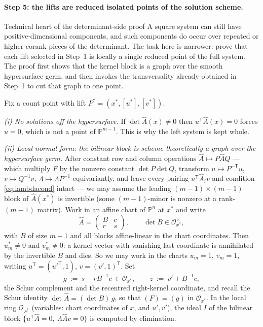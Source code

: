 \documentclass[acmsmall,screen,nonacm]{acmart}
\theoremstyle{definition}
\theoremstyle{remark}
\newcommand{\PP}{\mathbb{P}}
\newcommand{\OO}{\mathcal{O}}
\begin{document}
\paragraph{Step 5: the lifts are reduced isolated points of the
solution scheme.}
\begin{warningbox}{Technical heart of the determinant-side proof}
A square system can still have positive-dimensional components, and such
components do occur over repeated or higher-corank pieces of the determinant.
The task here is narrower: prove that each lift selected in Step~1 is locally
a single reduced point of the full system.  The proof first shows that the
kernel block is a graph over the smooth hypersurface germ, and then invokes
the transversality already obtained in Step~1 to cut that graph to one point.
\end{warningbox}
Fix a count point with lift $P^*=(x^*,[u^*],[v^*])$.

\emph{(i) No solutions off the hypersurface.}  If
$\det\widehat A(x)\ne0$ then $u^{\mathsf T}\widehat A(x)=0$ forces
$u=0$, which is not a point of $\PP^{m-1}$.  This is why the left
system is kept whole.

\emph{(ii) Local normal form: the bilinear block is
scheme-theoretically a graph over the hypersurface germ.}
After constant row and column operations
$\widehat A\mapsto P\widehat AQ$ --- which multiply $F$ by the nonzero
constant $\det P\det Q$, transform
$u\mapsto P^{-\mathsf T}u$, $v\mapsto Q^{-1}v$,
$\Lambda\mapsto\Lambda P^{-1}$ equivariantly, and leave every pairing
$u^{\mathsf T}\widehat A_iv$ and condition \eqref{eq:lambdacond}
intact --- we may assume the leading $(m-1)\times(m-1)$ block of
$\widehat A(x^*)$ is invertible (some $(m-1)$-minor is nonzero at a
rank-$(m-1)$ matrix).  Work in an affine chart of $\PP^n$ at $x^*$ and
write
\[
  \widehat A=\begin{pmatrix}B&c\\ r&s\end{pmatrix},
  \qquad \det B\in\OO_{x^*}^{\times},
\]
with $B$ of size $m-1$ and all blocks affine-linear in the chart
coordinates.  Then $u^*_m\ne0$ and $v^*_m\ne0$: a kernel vector with
vanishing last coordinate is annihilated by the invertible $B$ and
dies.  So we may work in the charts $u_m=1$, $v_m=1$, writing
$u^{\mathsf T}=(u'^{\mathsf T},1)$, $v=(v',1)^{\mathsf T}$.  Set
\[
  g\ :=\ s-rB^{-1}c\ \in\OO_{x^*},
  \qquad
  z\ :=\ v'+B^{-1}c ,
\]
the Schur complement and the recentred right-kernel coordinate, and
recall the Schur identity
$\det\widehat A=(\det B)\,g$, so that $(F)=(g)$ in $\OO_{x^*}$.  In
the local ring $\OO_{P^*}$ (variables: chart coordinates of $x$, and
$u',v'$), the ideal $I$ of the bilinear block
$\{u^{\mathsf T}\widehat A=0,\ \Lambda\widehat Av=0\}$ is computed by
elimination.
\end{document}
